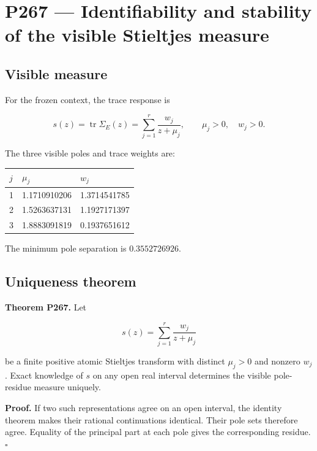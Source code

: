 \documentclass[11pt,a4paper,openany]{report}
\begin{document}
\chapter{P267 --- Identifiability and stability of the visible Stieltjes measure}

\section{Visible measure}

For the frozen context, the trace response is

\[
s(z)=\operatorname{tr}\Sigma_E(z)
=
\sum_{j=1}^{r}\frac{w_j}{z+\mu_j},
\qquad
\mu_j>0,\quad w_j>0.
\]

The three visible poles and trace weights are:

\begin{center}
\begingroup\small
\setlength{\tabcolsep}{2.5pt}
\renewcommand{\arraystretch}{1.16}
\begin{longtable}{@{}p{}p{}p{}@{}}
\toprule
\textbf{\(j\)} & \textbf{\(\mu_j\)} & \textbf{\(w_j\)} \\
\midrule
\endhead
1 & 1.1710910206 & 1.3714541785 \\
2 & 1.5263637131 & 1.1927171397 \\
3 & 1.8883091819 & 0.1937651612 \\
\bottomrule
\end{longtable}
\endgroup
\end{center}

The minimum pole separation is \(0.3552726926\).

\section{Uniqueness theorem}

\textbf{Theorem P267.} Let

\[
s(z)=\sum_{j=1}^{r}\frac{w_j}{z+\mu_j}
\]

be a finite positive atomic Stieltjes transform with distinct \(\mu_j>0\) and nonzero \(w_j\). Exact knowledge of \(s\) on any open real interval determines the visible pole-residue measure uniquely.

\textbf{Proof.} If two such representations agree on an open interval, the identity theorem makes their rational continuations identical. Their pole sets therefore agree. Equality of the principal part at each pole gives the corresponding residue. \(\square\)
\end{document}
